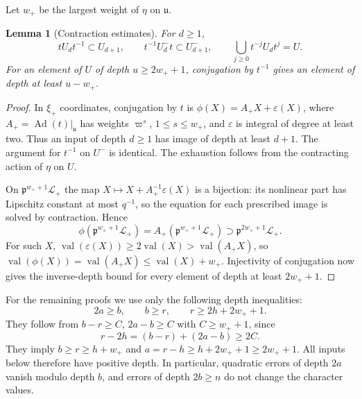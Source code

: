 \documentclass[11pt,reqno]{amsart}
\numberwithin{equation}{section}
\theoremstyle{plain}
\newtheorem{lemma}[theorem]{Lemma}
\theoremstyle{definition}
\theoremstyle{remark}
\theoremstyle{plain}
\newcommand{\pp}{\mathfrak{p}}   %
\newcommand{\Lat}{\mathcal{L}}   %
\newcommand{\g}{\mathfrak{g}}    %
\newcommand{\uu}{\mathfrak{u}}   %
\DeclareMathOperator{\Ad}{Ad}
\DeclareMathOperator{\val}{val}
\begin{document}
Let $w_+$ be the largest weight of $\eta$ on $\uu$.

\begin{lemma}[Contraction estimates]\label{lem:contraction}
For $d\ge1$,
\[
tU_dt^{-1}\subset U_{d+1},\qquad
t^{-1}U^-_dt\subset U^-_{d+1},\qquad
\bigcup_{j\ge0}t^{-j}U_dt^j=U.
\]
For an element of $U$ of depth $u\ge2w_++1$, conjugation by
$t^{-1}$ gives an element of depth at least $u-w_+$.
\end{lemma}

\begin{proof}
In $\xi_+$ coordinates, conjugation by $t$ is
$\phi(X)=A_+X+\varepsilon(X)$, where
$A_+=\Ad(t)|_\uu$ has weights $\varpi^s$, $1\le s\le w_+$, and
$\varepsilon$ is integral of degree at least two. Thus an input of
depth $d\ge1$ has image of depth at least $d+1$. The argument for
$t^{-1}$ on $U^-$ is identical. The exhaustion follows from the
contracting action of $\eta$ on $U$.

On $\pp^{w_++1}\Lat_+$ the map
$X\mapsto X+A_+^{-1}\varepsilon(X)$ is a bijection: its nonlinear
part has Lipschitz constant at most $q^{-1}$, so the equation for
each prescribed image is solved by contraction. Hence
\[
\phi(\pp^{w_++1}\Lat_+)
=A_+(\pp^{w_++1}\Lat_+)\supset\pp^{2w_++1}\Lat_+.
\]
For such $X$,
$\val(\varepsilon(X))\ge2\val(X)>\val(A_+X)$, so
$\val(\phi(X))=\val(A_+X)\le\val(X)+w_+$.
Injectivity of conjugation now gives the inverse-depth bound for
every element of depth at least $2w_++1$.
\end{proof}

For the remaining proofs we use only the following depth inequalities:
\begin{equation}\label{eq:used}
2a\ge b,\qquad b\ge r,\qquad r\ge2h+2w_++1.
\end{equation}
They follow from $b-r\ge C$, $2a-b\ge C$ with $C\ge w_++1$, since
\[
r-2h=(b-r)+(2a-b)\ge2C.
\]
They imply $b\ge r\ge h+w_+$ and $a=r-h\ge h+2w_++1\ge2w_++1$.
All inputs below therefore have positive depth. In particular,
quadratic errors of depth $2a$ vanish modulo depth $b$, and errors
of depth $2b\ge n$ do not change the character values.
\end{document}
